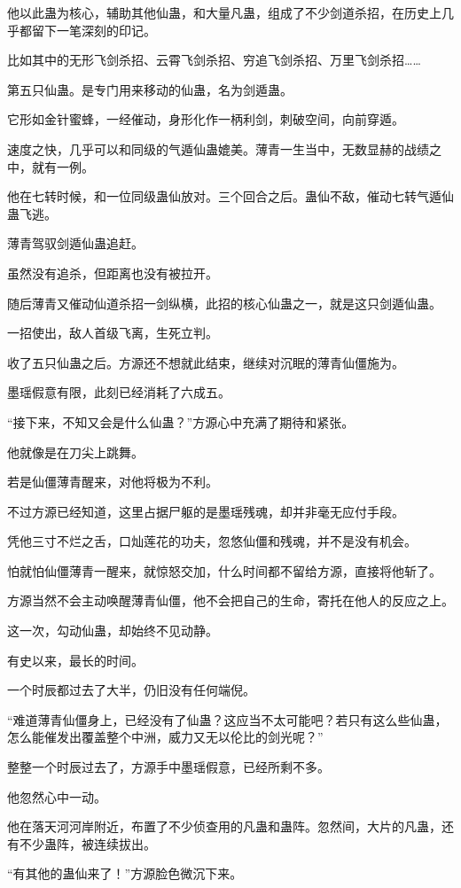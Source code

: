 \begin{this_body}
他以此蛊为核心，辅助其他仙蛊，和大量凡蛊，组成了不少剑道杀招，在历史上几乎都留下一笔深刻的印记。

比如其中的无形飞剑杀招、云霄飞剑杀招、穷追飞剑杀招、万里飞剑杀招……

第五只仙蛊。是专门用来移动的仙蛊，名为剑遁蛊。

它形如金针蜜蜂，一经催动，身形化作一柄利剑，刺破空间，向前穿遁。

速度之快，几乎可以和同级的气遁仙蛊媲美。薄青一生当中，无数显赫的战绩之中，就有一例。

他在七转时候，和一位同级蛊仙放对。三个回合之后。蛊仙不敌，催动七转气遁仙蛊飞逃。

薄青驾驭剑遁仙蛊追赶。

虽然没有追杀，但距离也没有被拉开。

随后薄青又催动仙道杀招一剑纵横，此招的核心仙蛊之一，就是这只剑遁仙蛊。

一招使出，敌人首级飞离，生死立判。

收了五只仙蛊之后。方源还不想就此结束，继续对沉眠的薄青仙僵施为。

墨瑶假意有限，此刻已经消耗了六成五。

“接下来，不知又会是什么仙蛊？”方源心中充满了期待和紧张。

他就像是在刀尖上跳舞。

若是仙僵薄青醒来，对他将极为不利。

不过方源已经知道，这里占据尸躯的是墨瑶残魂，却并非毫无应付手段。

凭他三寸不烂之舌，口灿莲花的功夫，忽悠仙僵和残魂，并不是没有机会。

怕就怕仙僵薄青一醒来，就惊怒交加，什么时间都不留给方源，直接将他斩了。

方源当然不会主动唤醒薄青仙僵，他不会把自己的生命，寄托在他人的反应之上。

这一次，勾动仙蛊，却始终不见动静。

有史以来，最长的时间。

一个时辰都过去了大半，仍旧没有任何端倪。

“难道薄青仙僵身上，已经没有了仙蛊？这应当不太可能吧？若只有这么些仙蛊，怎么能催发出覆盖整个中洲，威力又无以伦比的剑光呢？”

整整一个时辰过去了，方源手中墨瑶假意，已经所剩不多。

他忽然心中一动。

他在落天河河岸附近，布置了不少侦查用的凡蛊和蛊阵。忽然间，大片的凡蛊，还有不少蛊阵，被连续拔出。

“有其他的蛊仙来了！”方源脸色微沉下来。


\end{this_body}
